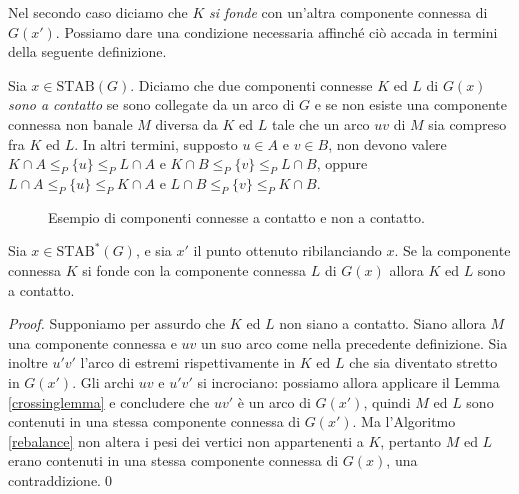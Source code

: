 Nel secondo caso diciamo che \(K\) \emph{si fonde} con un'altra componente connessa di \(G(x')\). Possiamo dare una condizione necessaria affinch\'e ci\`o accada in termini della seguente definizione. 
\begin{definition}
	Sia \(x\in\text{STAB}(G)\). Diciamo che due componenti connesse \(K\) ed \(L\) di \(G(x)\) \emph{sono a contatto} se sono collegate da un arco di \(G\) e se non esiste una componente connessa non banale \(M\) diversa da \(K\) ed \(L\) tale che un arco \(uv\) di \(M\) sia compreso fra \(K\) ed \(L\). In altri termini, supposto \(u\in A\) e \(v\in B\), non devono valere \(K\cap A\le_{P}\{u\}\le_{P}L\cap A\) e \(K\cap B\le_{P}\{v\}\le_{P}L\cap B\), oppure \(L\cap A\le_{P}\{u\}\le_{P}K\cap A\) e \(L\cap B\le_{P}\{v\}\le_{P}K\cap B\). 
\end{definition}
\begin{example}
    \begin{figure}
        \centering
        \caption{Esempio di componenti connesse a contatto e non a contatto.}
        \label{touchingexample}
    \end{figure}
\end{example}
\begin{lemma}
	\label{touchinglemma} Sia \(x\in\text{STAB}^{*}(G)\), e sia \(x'\) il punto ottenuto ribilanciando \(x\). Se la componente connessa \(K\) si fonde con la componente connessa \(L\) di \(G(x)\) allora \(K\) ed \(L\) sono a contatto. 
\end{lemma}
\begin{proof}
	Supponiamo per assurdo che \(K\) ed \(L\) non siano a contatto. Siano allora \(M\) una componente connessa e \(uv\) un suo arco come nella precedente definizione. Sia inoltre \(u'v'\) l'arco di estremi rispettivamente in \(K\) ed \(L\) che sia diventato stretto in \(G(x')\). Gli archi \(uv\) e \(u'v'\) si incrociano: possiamo allora applicare il Lemma \ref{crossinglemma} e concludere che \(uv'\) \`e un arco di \(G(x')\), quindi \(M\) ed \(L\) sono contenuti in una stessa componente connessa di \(G(x')\). Ma l'Algoritmo \ref{rebalance} non altera i pesi dei vertici non appartenenti a \(K\), pertanto \(M\) ed \(L\) erano contenuti in una stessa componente connessa di \(G(x)\), una contraddizione.\qed 
\end{proof}
